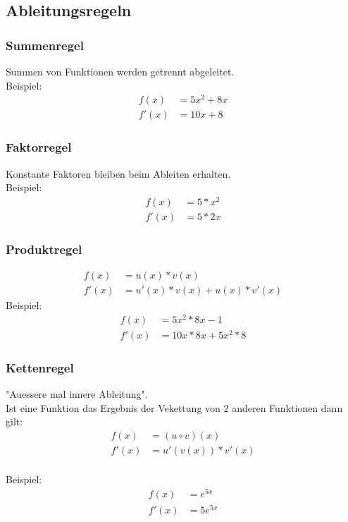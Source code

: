 \documentclass[a4paper]{article} %
\begin{document}
	\subsection{Ableitungsregeln}
	\subsubsection{Summenregel}
	Summen von Funktionen werden getrennt abgeleitet. \\
	Beispiel: \\ 
		\begin{align*}
			f(x) &= 5x^2+8x  \\
			 f'(x)&= 10x+8
		\end{align*}
	\subsubsection{Faktorregel}
	Konstante Faktoren bleiben beim Ableiten erhalten. \\
	Beispiel: \\ \begin{align*}
					f(x)&= 5*x^2 \\ 
					f'(x) &= 5*2x
				\end{align*}
	
	\subsubsection{Produktregel}
	\begin{align*}
		f(x)&=u(x)*v(x)\\
		f'(x)&=u'(x)*v(x)+u(x)*v'(x)
	\end{align*}
	Beispiel: \\ 
	\begin{align*}
		f(x) &= 5x^2*8x-1  \\
		f'(x)&= 10x*8x+5x^2*8
	\end{align*}
	\subsubsection{Kettenregel}
	"Auessere mal innere Ableitung".\\
	Ist eine Funktion das Ergebnis der Vekettung von 2 anderen Funktionen dann gilt:\\
	 \begin{align*}
		f(x)&=(u \circ v)(x)\\
		f'(x)&=u'(v(x))*v'(x)
	\end{align*}
	\\Beispiel:\\
		\begin{align*}
		f(x) &=e^{5x}\\
		f'(x)&=5e^{5x}
		\end{align*}
\end{document}

